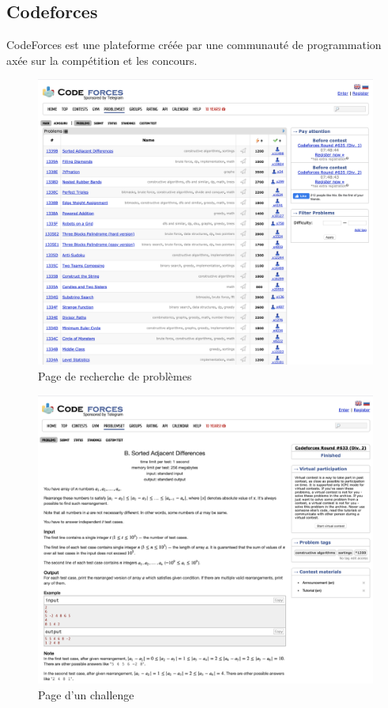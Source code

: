 \pagebreak
\subsection*{Codeforces}

CodeForces est une plateforme créée par une communauté de programmation axée sur la compétition et les concours.

\begin{figure}[H]
    \includegraphics[width=\textwidth,height=0.35\textheight,keepaspectratio]{images/comparison/codeforces-1.png}
    \centering
    \caption[Codeforces : page de recherche de problèmes]{Page de recherche de problèmes}
\end{figure}

\begin{figure}[H]
    \includegraphics[width=\textwidth,height=0.35\textheight,keepaspectratio]{images/comparison/codeforces-2.png}
    \centering
    \caption[Codeforces : page d'un challenge]{Page d'un challenge}
\end{figure}

